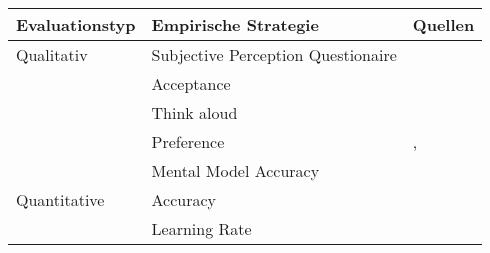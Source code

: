 \begin{table}
    \begin{center}
        \begin{tabular}{|p{}|p{}|p{}|}
            \hline
            \textbf{Evaluationstyp} & \textbf{Empirische Strategie} & \textbf{Quellen} \\ \hline
            Qualitativ  & Subjective Perception Questionaire &  \cite{balog_measuring_2020} \cite{sato_context_nodate}
                                                                \cite{waa_evaluating_2021} \cite{eiband_impact_2019}  \cite{kouki_user_2017} \cite{tsai_evaluating_2019}
                                                                \cite{hernandez-bocanegra_effects_2020}
                                                                \cite{zahedi_towards_2019} \cite{tsai_effects_2020} 
                                                                \cite{ribera2019can} \\
                        & Acceptance                        & \cite{tintarev_designing_nodate}
                                                            \cite{hernandez-bocanegra_effects_2020}
                                                            \cite{kunkel_let_2019} \\
                        & Think aloud                       & \cite{wiegand_id_2020} \cite{yamada_evaluating_2016} \\
                        & Preference                        & \cite{kouki_user_2017} \cite{mucha_interfaces_2021} 
                                                            \cite{abdulrahman_belief-based_2019} 
                                                            \cite{waa_evaluating_2021} \cite{wiegand_id_2020} ,
                                                            \cite{stange_effects_2021} \cite{kaptein_personalised_2017} \\
                        & Mental Model Accuracy             & \cite{gunning2019darpa} \\
            \hline
            Quantitative& Accuracy                          & \cite{tintarev_designing_nodate}
                                                            \cite{waa_evaluating_2021} \cite{mucha_interfaces_2021}
                                                            \cite{kunkel_let_2019} \cite{zolotas_towards_2019} \\
                        & Learning Rate                     & \cite{tintarev_designing_nodate} \cite{gunning2019darpa} \\

\end{tabular}
\end{center}
\end{table}
